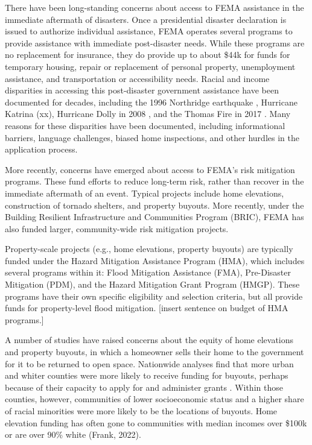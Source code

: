 \documentclass[
  authoryear,
  preprint]{elsarticle}
\begin{document}
There have been long-standing concerns about access to FEMA assistance
in the immediate aftermath of disasters. Once a presidential disaster
declaration is issued to authorize individual assistance, FEMA operates
several programs to provide assistance with immediate post-disaster
needs. While these programs are no replacement for insurance, they do
provide up to about \$44k for funds for temporary housing, repair or
replacement of personal property, unemployment assistance, and
transportation or accessibility needs. Racial and income disparities in
accessing this post-disaster government assistance have been documented
for decades, including the 1996 Northridge earthquake \citep{bolin1998},
Hurricane Katrina (xx), Hurricane Dolly in 2008 \citep{rivera2022}, and
the Thomas Fire in 2017 \citep{mendez2020}. Many reasons for these
disparities have been documented, including informational barriers,
language challenges, biased home inspections, and other hurdles in the
application process.

More recently, concerns have emerged about access to FEMA's risk
mitigation programs. These fund efforts to reduce long-term risk, rather
than recover in the immediate aftermath of an event. Typical projects
include home elevations, construction of tornado shelters, and property
buyouts. More recently, under the Building Resilient Infrastructure and
Communities Program (BRIC), FEMA has also funded larger, community-wide
risk mitigation projects.

Property-scale projects (e.g., home elevations, property buyouts) are
typically funded under the Hazard Mitigation Assistance Program (HMA),
which includes several programs within it: Flood Mitigation Assistance
(FMA), Pre-Disaster Mitigation (PDM), and the Hazard Mitigation Grant
Program (HMGP). These programs have their own specific eligibility and
selection criteria, but all provide funds for property-level flood
mitigation. {[}insert sentence on budget of HMA programs.{]}

A number of studies have raised concerns about the equity of home
elevations and property buyouts, in which a homeowner sells their home
to the government for it to be returned to open space. Nationwide
analyses find that more urban and whiter counties were more likely to
receive funding for buyouts, perhaps because of their capacity to apply
for and administer grants \citep{mach2019, elliott2020}. Within those
counties, however, communities of lower socioeconomic status and a
higher share of racial minorities were more likely to be the locations
of buyouts. Home elevation funding has often gone to communities with
median incomes over \$100k or are over 90\% white (Frank, 2022).
\end{document}
